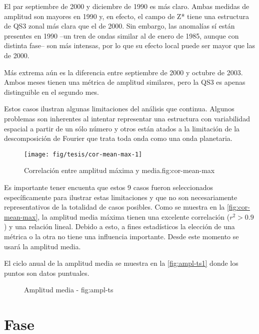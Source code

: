 \documentclass[spanish,a4paper]{book}
\begin{document}
El par septiembre de 2000 y diciembre de 1990 es más claro. Ambas
medidas de amplitud son mayores en 1990 y, en efecto, el campo de Z*
tiene una estructura de QS3 zonal más clara que el de 2000. Sin embargo,
las anomalías sí están presentes en 1990 --un tren de ondas similar al
de enero de 1985, aunque con distinta fase-- son más intensas, por lo
que su efecto local puede ser mayor que las de 2000.

Más extrema aún es la diferencia entre septiembre de 2000 y octubre de
2003. Ambos meses tienen una métrica de amplitud similares, pero la QS3
es apenas distinguible en el segundo mes.

Estos casos ilustran algunas limitaciones del análisis que continua.
Algunos problemas son inherentes al intentar representar una estructura
con variabilidad espacial a partir de un sólo número y otros están
atados a la limitación de la descomposición de Fourier que trata toda
onda como una onda
planetaria.

\begin{figure}
\texttt{[image: fig/tesis/cor-mean-max-1]} \caption{Correlación entre amplitud máxima y media.{fig:cor-mean-max}}\label{fig:cor-mean-max}
\end{figure}

Es importante tener encuenta que estos 9 casos fueron seleccionados
específicamente para ilustrar estas limitaciones y que no son
necesariamente representativos de la totalidad de casos posibles. Como
se muestra en la \autoref{fig:cor-mean-max}, la amplitud media máxima
tienen una excelente correlación (\(r^2>0.9\)) y una relación lineal.
Debido a esto, a fines estadísticos la elección de una métrica o la otra
no tiene una influencia importante. Desde este momento se usará la
amplitud media.

El ciclo anual de la amplitud media se muestra en la
\autoref{fig:ampl-ts1} donde los puntos son datos puntuales.

\begin{figure*}
\newline{}\caption{Amplitud media - fig:ampl-ts}\label{fig:ampl-ts}
\end{figure*}

\section{Fase}\label{fase}
\end{document}

